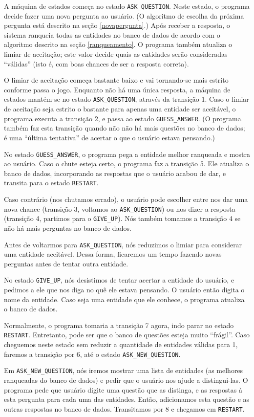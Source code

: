 \documentclass{article}
\newcommand{\ask}{\lstinline"ASK_QUESTION"}
\newcommand{\guess}{\lstinline"GUESS_ANSWER"}
\newcommand{\restart}{\lstinline"RESTART"}
\newcommand{\giveup}{\lstinline"GIVE_UP"}
\newcommand{\newquestion}{\lstinline"ASK_NEW_QUESTION"}
\begin{document}
A máquina de estados começa no estado \ask.
Neste estado, o programa decide fazer uma nova pergunta ao usuário.
(O algoritmo de escolha da próxima pergunta está descrito na seção \ref{novapergunta}.)
Após receber a resposta, o sistema ranqueia todas as entidades no banco de dados
de acordo com o algoritmo descrito na seção \ref{ranqueamento}.
O programa também atualiza o limiar de aceitação;
este valor decide quais as entidades serão consideradas ``válidas''
(isto é, com boas chances de ser a resposta correta).

O limiar de aceitação começa bastante baixo e vai tornando-se mais estrito
conforme passa o jogo.
Enquanto não há uma única resposta,
a máquina de estados mantém-se no estado \ask,
através da transição 1.
Caso o limiar de aceitação seja estrito o bastante
para apenas uma entidade ser aceitável,
o programa executa a transição 2,
e passa ao estado \guess.
(O programa também faz esta transição
quando não não há mais questões no banco de dados;
é uma ``última tentativa'' de acertar o que o usuário estava pensando.)

No estado \guess, o programa pega a entidade melhor ranqueada
e mostra ao usuário.
Caso o chute esteja certo, o programa faz a transição 5.
Ele atualiza o banco de dados,
incorporando as respostas que o usuário acabou de dar,
e transita para o estado \restart.

Caso contrário (nos chutamos errado),
o usuário pode escolher entre nos dar uma nova chance
(transição 3, voltamos ao \ask)
ou nos dizer a resposta
(transição 4, partimos para o \giveup).
Nós também tomamos a transição 4 se não há mais perguntas no banco de dados.

Antes de voltarmos para \ask, nós reduzimos o limiar
para considerar uma entidade aceitável.
Dessa forma, ficaremos um tempo fazendo novas perguntas
antes de tentar outra entidade.

No estado \giveup, nós desistimos de tentar acertar a entidade do usuário,
e pedimos a ele que nos diga no quê ele estava pensando.
O usuário então digita o nome da entidade.
Caso seja uma entidade que ele conhece, o programa atualiza o banco de dados.

Normalmente, o programa tomaria a transição 7 agora,
indo parar no estado \restart.
Entretanto, pode ser que o banco de questões esteja muito ``frágil''.
Caso cheguemos neste estado sem reduzir a quantidade de entidades válidas para 1,
faremos a transição por 6, até o estado \newquestion.

Em \newquestion, nós iremos mostrar uma lista de entidades
(as melhores ranqueadas do banco de dados)
e pedir que o usuário nos ajude a distingui-las.
O programa pede que usuário digite uma questão que as distinga,
e as respostas à esta pergunta para cada uma das entidades.
Então, adicionamos esta questão e as outras respostas no banco de dados.
Transitamos por 8 e chegamos em \restart.
\end{document}
